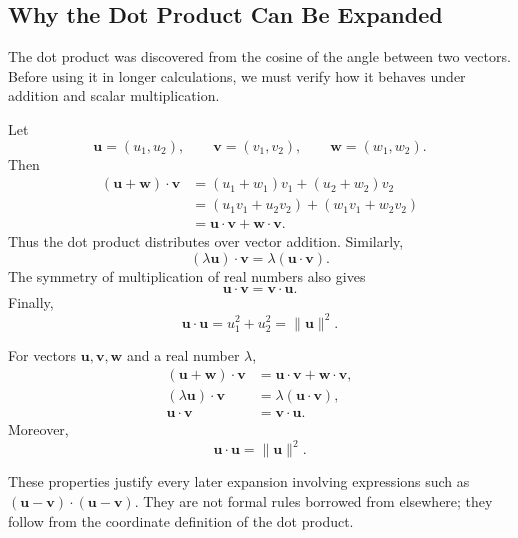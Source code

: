 \subsection{Why the Dot Product Can Be Expanded}

The dot product was discovered from the cosine of the angle between two
vectors. Before using it in longer calculations, we must verify how it behaves
under addition and scalar multiplication.

\begin{proofbox}
Let
\[
\mathbf u=(u_1,u_2),\qquad
\mathbf v=(v_1,v_2),\qquad
\mathbf w=(w_1,w_2).
\]
Then
\[
\begin{aligned}
(\mathbf u+\mathbf w)\cdot\mathbf v
&=(u_1+w_1)v_1+(u_2+w_2)v_2\\
&=(u_1v_1+u_2v_2)+(w_1v_1+w_2v_2)\\
&=\mathbf u\cdot\mathbf v+\mathbf w\cdot\mathbf v.
\end{aligned}
\]
Thus the dot product distributes over vector addition. Similarly,
\[
(\lambda\mathbf u)\cdot\mathbf v
=\lambda(\mathbf u\cdot\mathbf v).
\]
The symmetry of multiplication of real numbers also gives
\[
\mathbf u\cdot\mathbf v=\mathbf v\cdot\mathbf u.
\]
Finally,
\[
\mathbf u\cdot\mathbf u=u_1^2+u_2^2=\|\mathbf u\|^2.
\]
\end{proofbox}

\begin{theorembox}
For vectors $\mathbf u,\mathbf v,\mathbf w$ and a real number $\lambda$,
\[
\begin{aligned}
(\mathbf u+\mathbf w)\cdot\mathbf v
&=\mathbf u\cdot\mathbf v+\mathbf w\cdot\mathbf v,\\
(\lambda\mathbf u)\cdot\mathbf v
&=\lambda(\mathbf u\cdot\mathbf v),\\
\mathbf u\cdot\mathbf v
&=\mathbf v\cdot\mathbf u.
\end{aligned}
\]
Moreover,
\[
\boxed{\mathbf u\cdot\mathbf u=\|\mathbf u\|^2}.
\]
\end{theorembox}

\begin{remarkbox}
These properties justify every later expansion involving expressions such as
$(\mathbf u-\mathbf v)\cdot(\mathbf u-\mathbf v)$. They are not formal rules
borrowed from elsewhere; they follow from the coordinate definition of the dot
product.
\end{remarkbox}
